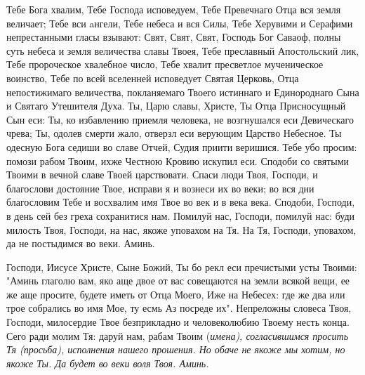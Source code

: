 \mychapterending





Тебе Бога хвалим, Тебе Господа исповедуем, Тебе Превечнаго Отца вся земля величает; Тебе вси aнгели, Тебе небеса и вся Силы, Тебе Херувими и Серафими непрестанными гласы взывают: Свят, Свят, Свят, Господь Бог Саваоф, полны суть небеса и земля величества славы Твоея, Тебе преславный Апостольский лик, Тебе пророческое хвалебное число, Тебе хвалит пресветлое мученическое воинство, Тебе по всей вселенней исповедует Святая Церковь, Отца непостижимаго величества, покланяемаго Твоего истиннаго и Единороднаго Сына и Святаго Утешителя Духа. Ты, Царю славы, Христе, Ты Отца Присносущный Сын еси: Ты, ко избавлению приемля человека, не возгнушался еси Девическаго чрева; Ты, одолев смерти жало, отверзл еси верующим Царство Небесное. Ты одесную Бога седиши во славе Отчей, Судия приити веришися. Тебе убо просим: помози рабом Твоим, ихже Честною Кровию искупил еси. Сподоби со святыми Твоими в вечной славе Твоей царствовати. Спаси люди Твоя, Господи, и благослови достояние Твое, исправи я и вознеси их во веки; во вся дни благословим Тебе и восхвалим имя Твое во век и в века века. Сподоби, Господи, в день сей без греха сохранитися нам. Помилуй нас, Господи, помилуй нас: буди милость Твоя, Господи, на нас, якоже уповахом на Тя. На Тя, Господи, уповахом, да не постыдимся во веки. Аминь.





\mychapterending




Господи, Иисусе Христе, Сыне Божий, Ты бо рекл еси пречистыми усты Твоими: "Аминь глаголю вам, яко аще двое от вас совещаются на земли всякой вещи, ее же аще просите, будете иметь от Отца Моего, Иже на Небесех: где же два или трое собрались во имя Мое, ту есмь Аз посреде их". Непреложны словеса Твоя, Господи, милосердие Твое безприкладно и человеколюбию Твоему несть конца. Сего ради молим Тя: даруй нам, рабам Твоим (\itshape имена\normalfont{}), согласившимся просить Тя (\itshape просьба\normalfont{}), исполнения нашего прошения. Но обаче не якоже мы хотим, но якоже Ты. Да будет во веки воля Твоя. Аминь.


\mychapterending





